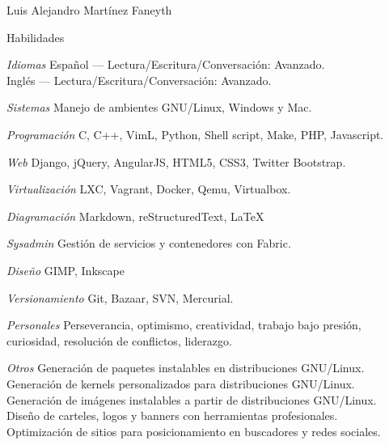 \documentclass[11pt,letterpaper]{article}
\begin{document}
\begin{cv}{Luis Alejandro Mart\'inez Faneyth}
\begin{cvlist}{Habilidades}
\item[\textit{\large{Idiomas}}]{
	Espa\~nol --- Lectura/Escritura/Conversaci\'on: Avanzado.\\
	Ingl\'es --- Lectura/Escritura/Conversaci\'on: Avanzado.
}
\item[\textit{\large{Sistemas}}]{Manejo de ambientes GNU/Linux, Windows y Mac.}
\item[\textit{\large{Programaci\'on}}]{C, C++, VimL, Python, Shell script, Make, PHP, Javascript.}
\item[\textit{\large{Web}}]{Django, jQuery, AngularJS, HTML5, CSS3, Twitter Bootstrap.}
\item[\textit{\large{Virtualizaci\'on}}]{LXC, Vagrant, Docker, Qemu, Virtualbox.}
\item[\textit{\large{Diagramaci\'on}}]{Markdown, reStructuredText, \LaTeX}
\item[\textit{\large{Sysadmin}}]{Gesti\'on de servicios y contenedores con Fabric.}
\item[\textit{\large{Dise\~no}}]{GIMP, Inkscape}
\item[\textit{\large{Versionamiento}}]{Git, Bazaar, SVN, Mercurial.}
\item[\textit{\large{Personales}}]{Perseverancia, optimismo, creatividad, trabajo bajo presi\'on, curiosidad, resoluci\'on de conflictos, liderazgo.}
\item[\textit{\large{Otros}}]{
	Generaci\'on de paquetes instalables en distribuciones GNU/Linux.\\
	Generaci\'on de kernels personalizados para distribuciones GNU/Linux.\\
	Generaci\'on de im\'agenes instalables a partir de distribuciones GNU/Linux.\\
	Dise\~no de carteles, logos y banners con herramientas profesionales.\\
	Optimizaci\'on de sitios para posicionamiento en buscadores y redes sociales.
}
\end{cvlist}

\end{cv}
\end{document}
